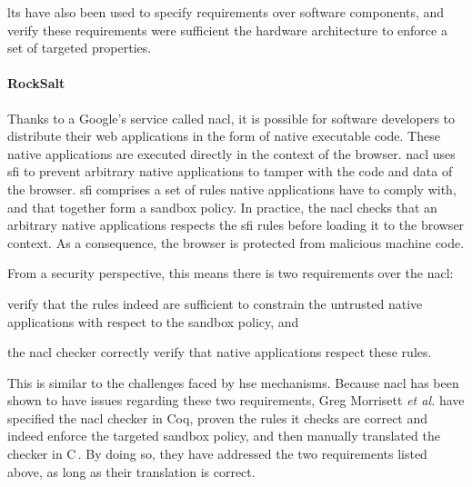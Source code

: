 \ac{lts} have also been used to specify requirements over software components,
and verify these requirements were sufficient the hardware architecture to
enforce a set of targeted properties.

\paragraph{RockSalt}
%
Thanks to a Google's service called \ac{nacl}, it is possible for software
developers to distribute their web applications in the form of native executable
code.
%
These native applications are executed directly in the context of the browser.
%
\ac{nacl} uses \ac{sfi} to prevent arbitrary native applications to tamper with
the code and data of the browser.
%
\ac{sfi} comprises a set of rules native applications have to comply with, and
that together form a sandbox policy.
%
In practice, the \ac{nacl} checks that an arbitrary native applications respects
the \ac{sfi} rules before loading it to the browser context.
%
As a consequence, the browser is protected from malicious machine code.

From a security perspective, this means there is two requirements over the
\ac{nacl}:
%
\begin{inparaenum}[(1)]
\item verify that the rules indeed are sufficient to constrain the untrusted
  native applications with respect to the sandbox policy, and
%
\item the \ac{nacl} checker correctly verify that native applications respect
  these rules.
\end{inparaenum}
%
This is similar to the challenges faced by \ac{hse} mechanisms.
%
Because \ac{nacl} has been shown to have issues regarding these two
requirements, Greg Morrisett \emph{et al.} have specified the \ac{nacl} checker
in Coq, proven the rules it checks are correct and indeed enforce the targeted
sandbox policy, and then manually translated the checker in
C\,\cite{morrisett2012rocksalt}.
%
By doing so, they have addressed the two requirements listed above, as long as
their translation is correct.

